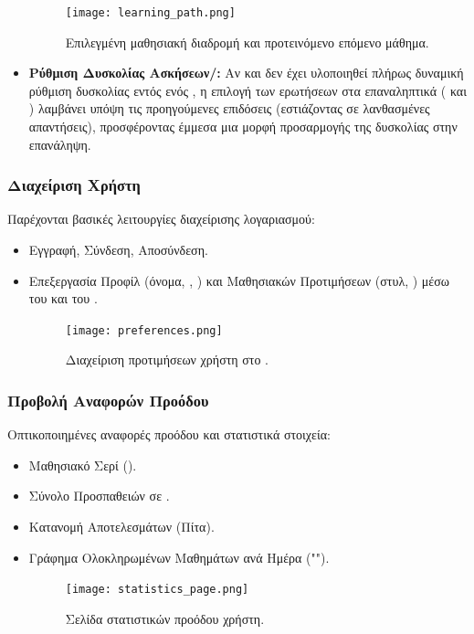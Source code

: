 \begin{itemize}[leftmargin=*, noitemsep]
        \begin{figure}[h!]
          \centering
          \texttt{[image: learning\_path.png]}
          \caption{Επιλεγμένη μαθησιακή διαδρομή και προτεινόμενο επόμενο μάθημα.}
          \label{fig:dashboard_path_placeholder}
        \end{figure}
    \item \textbf{Ρύθμιση Δυσκολίας Ασκήσεων/:} Αν και δεν έχει υλοποιηθεί πλήρως δυναμική ρύθμιση δυσκολίας εντός ενός , η επιλογή των ερωτήσεων στα επαναληπτικά  ( και ) λαμβάνει υπόψη τις προηγούμενες επιδόσεις (εστιάζοντας σε λανθασμένες απαντήσεις), προσφέροντας έμμεσα μια μορφή προσαρμογής της δυσκολίας στην επανάληψη.
\end{itemize}

\subsubsection{Διαχείριση Χρήστη}
\label{sec:diacheirisi_xristi}
Παρέχονται βασικές λειτουργίες διαχείρισης λογαριασμού:
\begin{itemize}[leftmargin=*, noitemsep]
    \item Εγγραφή, Σύνδεση, Αποσύνδεση.
    \item Επεξεργασία Προφίλ (όνομα, , ) και Μαθησιακών Προτιμήσεων (στυλ, ) μέσω του  και του .
        \begin{figure}[h!]
          \centering
          \texttt{[image: preferences.png]}
          \caption{Διαχείριση προτιμήσεων χρήστη στο .}
          \label{fig:dashboard_prefs_placeholder}
        \end{figure}
\end{itemize}

\subsubsection{Προβολή Αναφορών Προόδου}
\label{sec:anafores_proodou}
Οπτικοποιημένες αναφορές προόδου και στατιστικά στοιχεία:
\begin{itemize}[leftmargin=*, noitemsep]
    \item Μαθησιακό Σερί ().
    \item Σύνολο Προσπαθειών σε .
    \item Κατανομή Αποτελεσμάτων  (Πίτα).
    \item Γράφημα Ολοκληρωμένων Μαθημάτων ανά Ημέρα ("").
        \begin{figure}[h!]
          \centering
          \texttt{[image: statistics\_page.png]}
          \caption{Σελίδα στατιστικών προόδου χρήστη.}
          \label{fig:stats_page_placeholder}
        \end{figure}
\end{itemize}

